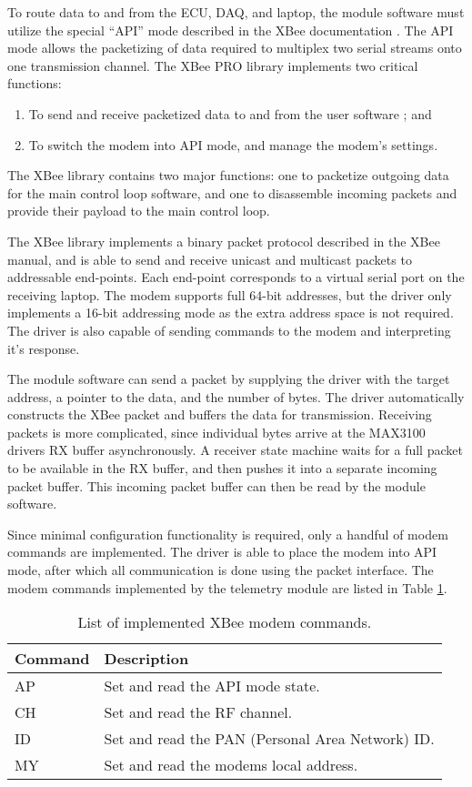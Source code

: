 To route data to and from the ECU, DAQ, and laptop, the module software must utilize the special ``API'' mode described in the XBee documentation \cite{XBeeManual}. The API mode allows the packetizing of data required to multiplex two serial streams onto one transmission channel. The XBee PRO library implements two critical functions:

\begin{enumerate}
\item To send and receive packetized data to and from the user software ; and
\item To switch the modem into API mode, and manage the modem's settings.
\end{enumerate}

The XBee library contains two major functions: one to packetize outgoing data for the main control loop software, and one to disassemble incoming packets and provide their payload to the main control loop.

The XBee library implements a binary packet protocol described in the XBee manual, and is able to send and receive unicast and multicast packets to addressable end-points. Each end-point corresponds to a virtual serial port on the receiving laptop. The modem supports full 64-bit addresses, but the driver only implements a 16-bit addressing mode as the extra address space is not required. The driver is also capable of sending commands to the modem and interpreting it's response.

The module software can send a packet by supplying the driver with the target address, a pointer to the data, and the number of bytes. The driver automatically constructs the XBee packet and buffers the data for transmission. Receiving packets is more complicated, since individual bytes arrive at the MAX3100 drivers RX buffer asynchronously. A receiver state machine waits for a full packet to be available in the RX buffer, and then pushes it into a separate incoming packet buffer. This incoming packet buffer can then be read by the module software.

Since minimal configuration functionality is required, only a handful of modem commands are implemented. The driver is able to place the modem into API mode, after which all communication is done using the packet interface. The modem commands implemented by the telemetry module are listed in Table \ref{tab:xbee_commands}.

\begin{table}[H]
\caption{List of implemented XBee modem commands.}
\centering{}
\begin{tabular}{|l|l|}
\hline 
Command & Description \tabularnewline
\hline
\hline
AP & Set and read the API mode state. \tabularnewline
\hline
CH & Set and read the RF channel. \tabularnewline
\hline 
ID & Set and read the PAN (Personal Area Network) ID. \tabularnewline
\hline
MY & Set and read the modems local address. \tabularnewline
\hline
\end{tabular}
\label{tab:xbee_commands}
\end{table}

